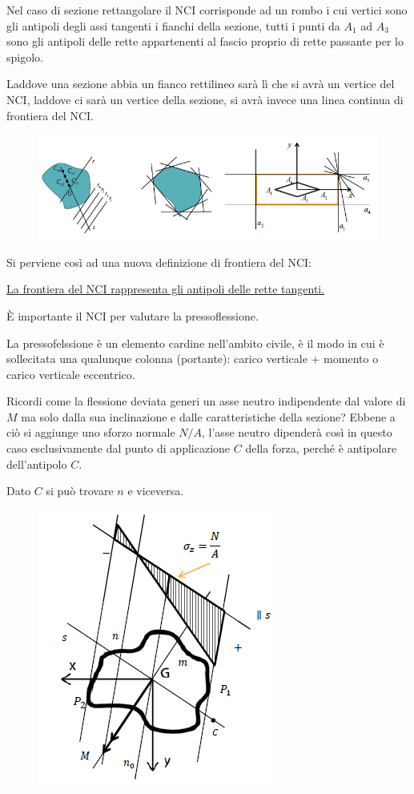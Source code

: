 		Nel caso di sezione rettangolare il NCI corrisponde ad un rombo i cui vertici sono gli antipoli degli assi tangenti i fianchi della sezione, tutti i punti da $A_1$ ad $A_3$ sono gli antipoli delle rette appartenenti al fascio proprio di rette passante per lo spigolo.
		
		Laddove una sezione abbia un fianco rettilineo sarà lì che si avrà un vertice del NCI, laddove ci sarà un vertice della sezione, si avrà invece una linea continua di frontiera del NCI.
		
\begin{figure}[H]
	\centering
	\includegraphics[width=0.7\linewidth]{immagini_4/screenshot007}
	\label{fig:screenshot007}
\end{figure}

		Si perviene così ad una nuova definizione di frontiera del NCI: 
		
		\hyperref[frontiera]{La frontiera del NCI rappresenta gli antipoli delle rette tangenti.} \newline
		
		È importante il NCI per valutare la pressoflessione. 
		
		La pressofelssione è un elemento cardine nell'ambito civile, è il modo in cui è sollecitata una qualunque colonna (portante): carico verticale + momento o carico verticale eccentrico. 
		
		Ricordi come la flessione deviata generi un asse neutro indipendente dal valore di $M$ ma solo dalla sua inclinazione e dalle caratteristiche della sezione? Ebbene a ciò si aggiunge uno sforzo normale $N/A$, l'asse neutro dipenderà così in questo caso esclusivamente dal punto di applicazione $C$ della forza, perché è antipolare dell'antipolo $C$.
		
		Dato $C$ si può trovare $n$ e viceversa.
		
\begin{figure}[H]
	\centering
	\includegraphics[width=0.5\linewidth]{immagini_4/screenshot008}
	\label{fig:screenshot008}
\end{figure}

